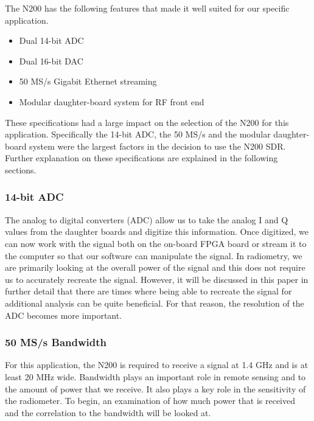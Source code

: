 The N200 has the following features that made it well suited for our specific application.

\begin{itemize}
\item Dual 14-bit ADC
\item Dual 16-bit DAC
\item 50 MS/s Gigabit Ethernet streaming
\item Modular daughter-board system for RF front end
\end{itemize}

These specifications had a large impact on the selection of the N200 for this application.  Specifically the 14-bit ADC, the 50 MS/s and the modular daughter-board system were the largest factors in the decision to use the N200 SDR.  Further explanation on these specifications are explained in the following sections.

\subsubsection{14-bit ADC}
The analog to digital converters (ADC) allow us to take the analog I and Q values from the daughter boards and digitize this information.  Once digitized, we can now work with the signal both on the on-board FPGA board or stream it to the computer so that our software can manipulate the signal.  In radiometry, we are primarily looking at the overall power of the signal and this does not require us to accurately recreate the signal.  However, it will be discussed in this paper in further detail that there are times where being able to recreate the signal for additional analysis can be quite beneficial.  For that reason, the resolution of the ADC becomes more important.

\subsubsection{50 MS/s Bandwidth}
For this application, the N200 is required to receive a signal at 1.4 GHz and is at least 20 MHz wide.  Bandwidth plays an important role in remote sensing and to the amount of power that we receive.  It also plays a key role in the sensitivity of the radiometer.  To begin, an examination of how much power that is received and the correlation to the bandwidth will be looked at.

